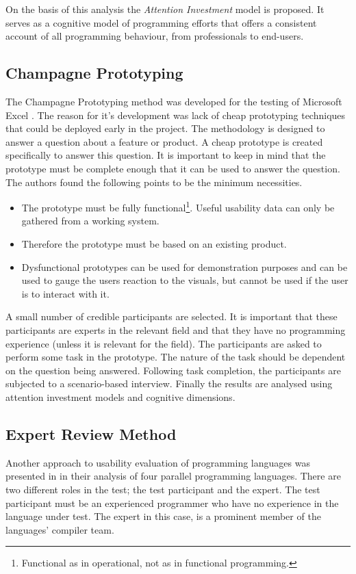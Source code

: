 On  the  basis  of  this  analysis  the  \textit{Attention Investment} model is proposed. It serves as a cognitive model of programming efforts that offers a consistent account of all programming behaviour, from professionals to end-users.

\subsection{Champagne Prototyping} \label{sec:champagne}
The Champagne Prototyping method was developed for the testing of Microsoft Excel \cite{blackwell2004champagne}. The reason for it's development was lack of cheap prototyping techniques that could be deployed early in the project. The methodology is designed to answer a question about a feature or product. A cheap prototype is created specifically to answer this question. It is important to keep in mind that the prototype must be complete enough that it can be used to answer the question. The authors found the following points to be the minimum necessities.
\begin{itemize}
    \item The prototype must be fully functional\footnote{Functional as in operational, not as in functional programming.}. Useful usability data can only be gathered from a working system.
    \item Therefore the prototype must be based on an existing product.
    \item Dysfunctional prototypes can be used for demonstration purposes and can be used to gauge the users reaction to the visuals, but cannot be used if the user is to interact with it.
\end{itemize}
A small number of credible participants are selected. It is important that these participants are experts in the relevant field and that they have no programming experience (unless it is relevant for the field). The participants are asked to perform some task in the prototype. The nature of the task should be dependent on the question being answered. Following task completion, the participants are subjected to a scenario-based interview. Finally the results are analysed using attention investment models and cognitive dimensions.

\subsection{Expert Review Method} \label{sec:expert-review}
Another approach to usability evaluation of programming languages was presented in \cite{nanz2013examining} in their analysis of four parallel programming languages. There are two different roles in the test; the test participant and the expert. The test participant must be an experienced programmer who have no experience in the language under test. The expert in this case, is a prominent member of the languages' compiler team.

